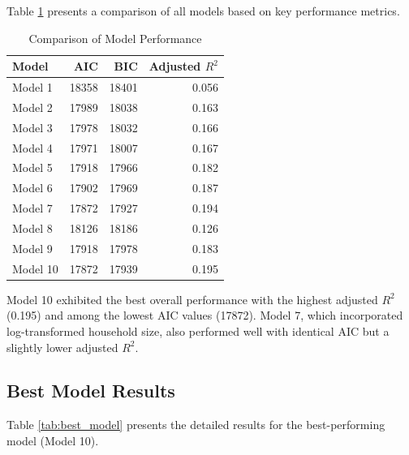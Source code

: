 \documentclass[12pt]{article}
\begin{document}
Table \ref{tab:model_comparison} presents a comparison of all models based on key performance metrics.

\begin{table}[h]
\centering
\caption{Comparison of Model Performance}
\label{tab:model_comparison}
\begin{tabular}{lrrr}
\toprule
Model & AIC & BIC & Adjusted $R^2$ \\
\midrule
Model 1 & 18358 & 18401 & 0.056 \\
Model 2 & 17989 & 18038 & 0.163 \\
Model 3 & 17978 & 18032 & 0.166 \\
Model 4 & 17971 & 18007 & 0.167 \\
Model 5 & 17918 & 17966 & 0.182 \\
Model 6 & 17902 & 17969 & 0.187 \\
Model 7 & 17872 & 17927 & 0.194 \\
Model 8 & 18126 & 18186 & 0.126 \\
Model 9 & 17918 & 17978 & 0.183 \\
Model 10 & 17872 & 17939 & 0.195 \\
\bottomrule
\end{tabular}
\end{table}

Model 10 exhibited the best overall performance with the highest adjusted $R^2$ (0.195) and among the lowest AIC values (17872). Model 7, which incorporated log-transformed household size, also performed well with identical AIC but a slightly lower adjusted $R^2$.

\subsection{Best Model Results}

Table \ref{tab:best_model} presents the detailed results for the best-performing model (Model 10).
\end{document}
